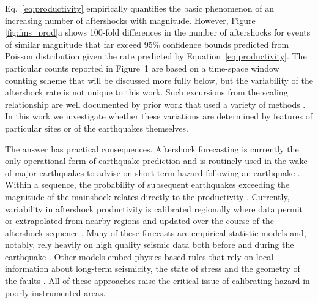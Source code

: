 \documentclass[draft, jgrga]{agujournal2018}
\begin{document}
Eq.~\ref{eq:productivity} empirically quantifies the basic phenomenon of an increasing number of aftershocks with magnitude. However, Figure \ref{fig:fms_prod}a shows 100-fold differences in the number of aftershocks for events of similar magnitude that far exceed 95\% confidence bounds predicted from Poisson distribution given the rate predicted by Equation~\ref{eq:productivity}. The particular counts reported in Figure~1 are based on a time-space window counting scheme that will be discussed more fully below, but the variability of the aftershock rate is not unique to this work. Such excursions from the scaling relationship are  well documented by prior work that used a variety of methods \citep[e.g.][]{Marsan2017HowAftershocks,Boettcher2004EarthquakeFaults,Page,Tahir2014Aftershock2005}. In this work we investigate whether these variations are determined by features of particular sites or of the earthquakes themselves.

The answer has practical consequences. Aftershock forecasting is currently the only operational form of earthquake prediction and is routinely used in the wake of major earthquakes to advise on short-term hazard following an earthquake \citep{Reasenberg1989, Page,Hardebeck2018UpdatedParameters}. Within a sequence, the probability of subsequent earthquakes exceeding the magnitude of the mainshock relates directly to the productivity \citep{Reasenberg1989, Reasenberg1999ForeshockEarthquakes}. Currently, variability in aftershock productivity is calibrated regionally where data permit or extrapolated from nearby regions and updated over the course of the aftershock sequence \citep[e.g.][]{Reasenberg1989, Reasenberg1999ForeshockEarthquakes, ogata2017statistics}. Many of these forecasts are empirical statistic models and, notably, rely heavily on high quality seismic data both before and during the earthquake \citep{Gerstenberger2005Real-timeCalifornia, Omi2015Intermediate-termApproaches}. Other models embed physics-based rules that rely on local information about long-term seismicity, the state of stress and the geometry of the faults \citep[e.g.][]{Segou2016ProspectiveMainshock, Field2017AForecast}. All of these approaches raise the critical issue of calibrating hazard in poorly instrumented areas.
\end{document}

